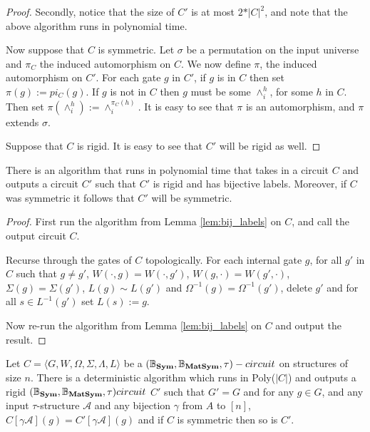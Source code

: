 \documentclass[../paper.tex]{subfiles}
\begin{document}
\begin{proof}
  Secondly, notice that the size of $C'$ is at most $2*\vert C \vert^2$, and
  note that the above algorithm runs in polynomial time.

  Now suppose that $C$ is symmetric. Let $\sigma$ be a permutation on the input
  universe and $\pi_C$ the induced automorphism on $C$. We now define $\pi$, the
  induced automorphism on $C'$. For each gate $g$ in $C'$, if $g$ is in $C$ then
  set $\pi(g) := pi_C(g)$. If $g$ is not in $C$ then $g$ must be some
  $\land^h_i$, for some $h$ in $C$. Then set $\pi(\land^h_i) :=
  \land^{\pi_C(h)}_i$. It is easy to see that $\pi$ is an automorphism, and
  $\pi$ extends $\sigma$.

  Suppose that $C$ is rigid. It is easy to see that $C'$ will be rigid as well.

\end{proof}


\begin{lem}
  There is an algorithm that runs in polynomial time that takes in a circuit $C$
  and outputs a circuit $C'$ such that $C'$ is rigid and has bijective labels.
  Moreover, if $C$ was symmetric it follows that $C'$ will be symmetric.
\end{lem}

\begin{proof}
  First run the algorithm from Lemma \ref{lem:bij_labels} on $C$, and call the
  output circuit $C$.
  
  Recurse through the gates of $C$ topologically. For each internal gate $g$,
  for all $g'$ in $C$ such that $g \neq g'$, $W(\cdot, g) = W(\cdot, g')$, $W(g,
  \cdot) = W(g', \cdot)$, $\Sigma(g) = \Sigma(g')$, $L(g) \sim L(g')$ and
  $\Omega^{-1}(g) = \Omega^{-1}(g')$, delete $g'$ and for all $s \in L^{-1}(g')$
  set $L(s) := g$.

  Now re-run the algorithm from Lemma \ref{lem:bij_labels} on $C$ and output the
  result.
\end{proof}

  \begin{lem}
    Let $C = \langle G, W, \Omega, \Sigma, \Lambda, L \rangle$ be a $(\mathbb{B}_{\text{\textbf{Sym}}}, \mathbb{B}_{\text{\textbf{MatSym}}},
    \tau)-circuit$ on structures of size $n$. There is a deterministic algorithm
    which runs in Poly($\vert C \vert$) and outputs a rigid $(\mathbb{B}_{\text{\textbf{Sym}}}, \mathbb{B}_{\text{\textbf{MatSym}}}, \tau)
    circuit$ $C'$ such that $G' = G$ and for any $g \in G$, and any input
    $\tau$-structure $\mathcal{A}$ and any bijection $\gamma$ from $A$ to $[n]$,
    $C[\gamma \mathcal{A}](g) = C'[\gamma \mathcal{A}](g)$ and if $C$ is
    symmetric then so is $C'$.
  \end{lem}
\end{document}
